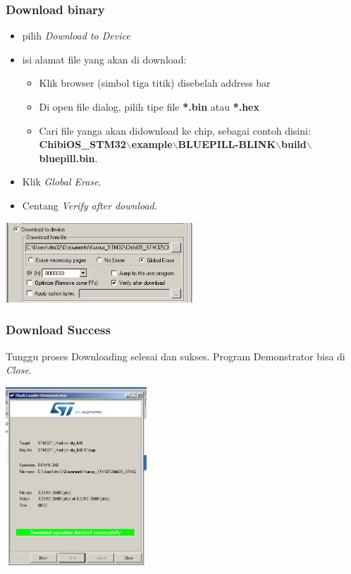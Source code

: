 \documentclass[table,dvipsnames]{beamer}
\begin{document}
	\begin{frame}
		\frametitle{Download binary}
		\begin{block}{}
			\begin{itemize}
				\item pilih \textit{Download to Device}
				\item isi alamat file yang akan di download:
				\begin{itemize}
					\item Klik browser (simbol tiga titik) disebelah address bar
					\item Di open file dialog, pilih tipe file \textbf{*.bin} atau \textbf{*.hex}
					\item Cari file yanga akan didownload ke chip, sebagai contoh disini:\\
					\textbf{ChibiOS\_STM32$\backslash$example$\backslash$BLUEPILL-BLINK$\backslash$build$\backslash$bluepill.bin}.
				\end{itemize}
				\item Klik \textit{Global Erase}.
				\item Centang \textit{Verify after download}.
			\end{itemize}
		\end{block}
		\begin{center}
			\includegraphics[width=200pt]{images/demons3}
		\end{center}
	\end{frame}

	\begin{frame}
		\frametitle{Download Success}
		\begin{block}{}
			Tunggu proses Downloading selesai dan sukses.
			Program Demonstrator bisa di \textit{Close}.
		\end{block}
		\begin{center}
			\includegraphics[width=150pt]{images/demons4}
		\end{center}
	\end{frame}
\end{document}
